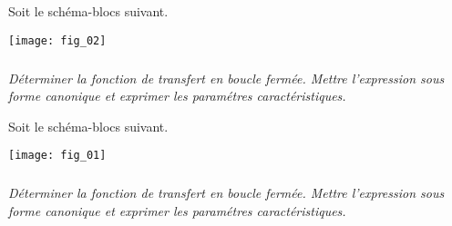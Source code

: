 \setcounter{exo}{0}

Soit le schéma-blocs suivant.
\begin{center}
\texttt{[image: fig\_02]}
\end{center}

\subparagraph{}
\textit{Déterminer la fonction de transfert en boucle fermée. Mettre l'expression sous forme canonique et exprimer les paramétres caractéristiques.}


Soit le schéma-blocs suivant.
\begin{center}
\texttt{[image: fig\_01]}
\end{center}

\subparagraph{}
\textit{Déterminer la fonction de transfert en boucle fermée. Mettre l'expression sous forme canonique et exprimer les paramétres caractéristiques.}